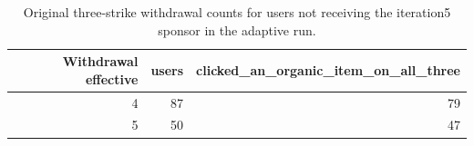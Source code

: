\begin{table}[htbp!]
\centering
\small
\setlength{\tabcolsep}{3pt}
\renewcommand{\arraystretch}{1.1}
\begin{tabular}{rrr}
\hline
Withdrawal effective & users & clicked\_an\_organic\_item\_on\_all\_three \\
\hline
4 & 87 & 79 \\
5 & 50 & 47 \\
\hline
\end{tabular}
\caption{Original three-strike withdrawal counts for users not receiving the iteration5 sponsor in the adaptive run.}
\label{chap:results:tab:rq1_spike_withdrawals}
\end{table}
